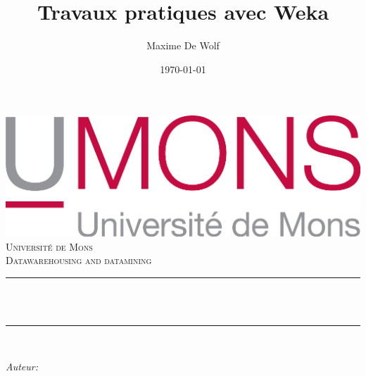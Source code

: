 \documentclass[10pt,a4paper]{article}
\title{Travaux pratiques avec Weka}                             %
\author{Maxime De Wolf}                               %
\date{\today}                                           %
\makeatletter
\let\thetitle\@title
\let\theauthor\@author
\let\thedate\@date
\makeatother
\begin{document}
   	
   	
   	\begin{titlepage}
   		\centering
   		\vspace*{0.5 cm}
   		\includegraphics[scale = 0.75]{UMONS}\\[1.0 cm]   %
   		\textsc{\LARGE Université de Mons}\\[2.0 cm]   %
   		\textsc{\large Datawarehousing and datamining}\\[0.5 cm]               %
   		\rule{\linewidth}{0.2 mm} \\[0.4 cm]
   		{ \huge \bfseries \thetitle}\\
   		\rule{\linewidth}{0.2 mm} \\[1.5 cm]
   		
   		\begin{minipage}{0.4\textwidth}
   			\begin{flushleft} \large
   				\emph{Auteur:}\\
   				\theauthor
   			\end{flushleft}
   		\end{minipage}~
   		\begin{minipage}{0.4\textwidth}
   			\begin{flushright} \large
   			\end{flushright}
   		\end{minipage}\\[2 cm]
   		
   		{\large \thedate}\\[2 cm]
   		
   		\vfill
   		
   	\end{titlepage}
   	
   	
   	\tableofcontents
   	\newpage
   	
\end{document}
